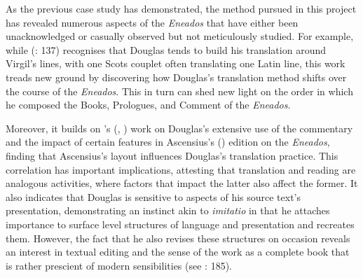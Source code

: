 \documentclass{dhbenelux}
\begin{document}
As the previous case study has demonstrated, the method pursued in this
project has revealed numerous aspects of the \emph{Eneados} that have
either been unacknowledged or casually observed but not meticulously
studied. For example, while \citeauthor{bawcutt1976} (\citeyear{bawcutt1976}: 137) recognises that Douglas
tends to build his translation around Virgil's lines, with one Scots
couplet often translating one Latin line, this work treads new ground by
discovering how Douglas's translation method shifts over the course of
the \emph{Eneados}. This in turn can shed new light on the order in
which he composed the Books, Prologues, and Comment of the
\emph{Eneados}.

Moreover, it builds on \citeauthor{bawcutt1973}'s (\citeyear{bawcutt1973}, \citeyear{bawcutt1976}) work on Douglas's
extensive use of the commentary and the impact of certain features in
Ascensius's (\citeyear{virgil1501}) edition on the \emph{Eneados}, finding that
Ascensius's layout influences Douglas's translation practice. This
correlation has important implications, attesting that translation and
reading are analogous activities, where factors that impact the latter
also affect the former. It also indicates that Douglas is sensitive to
aspects of his source text's presentation, demonstrating an instinct
akin to \emph{imitatio} in that he attaches importance to surface level
structures of language and presentation and recreates them. However, the
fact that he also revises these structures on occasion reveals an
interest in textual editing and the sense of the work as a complete book
that is rather prescient of modern sensibilities (see \citeauthor{griffiths2009} \citeyear{griffiths2009}:
185).
\end{document}
